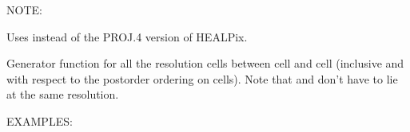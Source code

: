 \documentclass[a4paper,12ptopenany,oneside,english]{sphinxmanual}
\begin{document}
\begin{fulllineitems}
\begin{fulllineitems}
\begin{sphinxVerbatim}[commandchars=\\\{\}]
  
      
\end{sphinxVerbatim}

\sphinxAtStartPar
NOTE:

\sphinxAtStartPar
Uses  instead of the PROJ.4 version of HEALPix.

\end{fulllineitems}


\begin{fulllineitems}
\label{\detokenize{dggs:rhealpixdggs.dggs.RHEALPixDGGS.interval}}
\pysigstartsignatures
\pysiglinewithargsret
{}
{\sphinxparamcomma {}}
{}
\pysigstopsignatures
\sphinxAtStartPar
Generator function for all the resolution
 cells between cell
 and cell  (inclusive and with respect to the
postorder ordering on cells).
Note that  and  don’t have to lie at the same resolution.

\sphinxAtStartPar
EXAMPLES:


\end{fulllineitems}
\end{fulllineitems}
\end{document}
